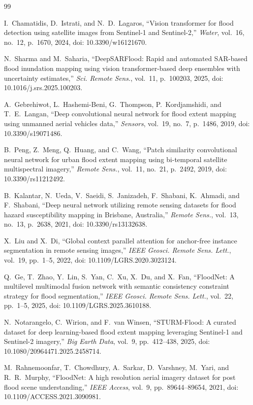 \documentclass[11pt,journal]{IEEEtran}
\begin{document}
\begin{thebibliography}{99}
\small

I.~Chamatidis, D.~Istrati, and N.~D.~Lagaros, ``Vision transformer for flood
detection using satellite images from Sentinel-1 and Sentinel-2,''
\emph{Water}, vol.~16, no.~12, p.~1670, 2024, doi: 10.3390/w16121670.

N.~Sharma and M.~Saharia, ``DeepSARFlood: Rapid and automated SAR-based flood
inundation mapping using vision transformer-based deep ensembles with
uncertainty estimates,'' \emph{Sci. Remote Sens.}, vol.~11, p.~100203, 2025,
doi: 10.1016/j.srs.2025.100203.

A.~Gebrehiwot, L.~Hashemi-Beni, G.~Thompson, P.~Kordjamshidi, and T.~E.~Langan,
``Deep convolutional neural network for flood extent mapping using unmanned
aerial vehicles data,'' \emph{Sensors}, vol.~19, no.~7, p.~1486, 2019,
doi: 10.3390/s19071486.

B.~Peng, Z.~Meng, Q.~Huang, and C.~Wang, ``Patch similarity convolutional neural
network for urban flood extent mapping using bi-temporal satellite multispectral
imagery,'' \emph{Remote Sens.}, vol.~11, no.~21, p.~2492, 2019,
doi: 10.3390/rs11212492.

B.~Kalantar, N.~Ueda, V.~Saeidi, S.~Janizadeh, F.~Shabani, K.~Ahmadi, and
F.~Shabani, ``Deep neural network utilizing remote sensing datasets for flood
hazard susceptibility mapping in Brisbane, Australia,'' \emph{Remote Sens.},
vol.~13, no.~13, p.~2638, 2021, doi: 10.3390/rs13132638.

X.~Liu and X.~Di, ``Global context parallel attention for anchor-free instance
segmentation in remote sensing images,'' \emph{IEEE Geosci. Remote Sens. Lett.},
vol.~19, pp.~1--5, 2022, doi: 10.1109/LGRS.2020.3023124.

Q.~Ge, T.~Zhao, Y.~Lin, S.~Yan, C.~Xu, X.~Du, and X.~Fan, ``FloodNet: A
multilevel multimodal fusion network with semantic consistency constraint
strategy for flood segmentation,'' \emph{IEEE Geosci. Remote Sens. Lett.},
vol.~22, pp.~1--5, 2025, doi: 10.1109/LGRS.2025.3610188.

N.~Notarangelo, C.~Wirion, and F.~van Winsen, ``STURM-Flood: A curated dataset
for deep learning-based flood extent mapping leveraging Sentinel-1 and
Sentinel-2 imagery,'' \emph{Big Earth Data}, vol.~9, pp.~412--438, 2025,
doi: 10.1080/20964471.2025.2458714.

M.~Rahnemoonfar, T.~Chowdhury, A.~Sarkar, D.~Varshney, M.~Yari, and R.~R.~Murphy,
``FloodNet: A high resolution aerial imagery dataset for post flood scene
understanding,'' \emph{IEEE Access}, vol.~9, pp.~89644--89654, 2021,
doi: 10.1109/ACCESS.2021.3090981.


\end{thebibliography}
\end{document}
